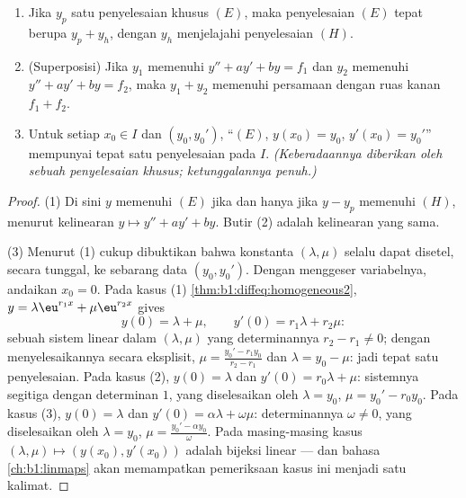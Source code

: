 \begin{theorem}\label{thm:b1:diffeq:structure2}
\begin{enumerate}
  \item Jika $y_p$ satu penyelesaian khusus $(E)$, maka penyelesaian
        $(E)$ tepat berupa $y_p + y_h$, dengan $y_h$ menjelajahi
        penyelesaian $(H)$.
  \item (Superposisi) Jika $y_1$ memenuhi $y'' + ay' + by = f_1$ dan
        $y_2$ memenuhi $y'' + ay' + by = f_2$, maka $y_1 + y_2$ memenuhi
        persamaan dengan ruas kanan $f_1 + f_2$.
  \item Untuk setiap $x_0 \in I$ dan $(y_0, y_0')$, 
        ``$(E)$, $y(x_0) = y_0$, $y'(x_0) = y_0'$'' mempunyai tepat satu
        penyelesaian pada $I$. \emph{(Keberadaannya diberikan oleh sebuah
        penyelesaian khusus; ketunggalannya penuh.)}
\end{enumerate}
\end{theorem}

\begin{proof}
(1) Di sini $y$ memenuhi $(E)$ jika dan hanya jika $y - y_p$ memenuhi $(H)$, menurut kelinearan $y
\mapsto y'' + ay' + by$. Butir (2) adalah kelinearan yang sama.

(3) Menurut (1) cukup dibuktikan bahwa konstanta $(\lambda,
\mu)$ selalu dapat disetel, secara tunggal, ke sebarang data $(y_0, y_0')$.
Dengan menggeser variabelnya, andaikan $x_0 = 0$. Pada kasus (1)
\cref{thm:b1:diffeq:homogeneous2}, $y = \lambda\eu^{r_1x} +
\mu\eu^{r_2x}$ gives
\[
y(0) = \lambda + \mu, \qquad y'(0) = r_1\lambda + r_2\mu :
\]
sebuah sistem linear dalam $(\lambda, \mu)$ yang determinannya $r_2 -
r_1 \neq 0$; dengan menyelesaikannya secara eksplisit, $\mu = \frac{y_0' -
r_1y_0}{r_2 - r_1}$ dan $\lambda = y_0 - \mu$: jadi tepat satu
penyelesaian. Pada kasus (2), $y(0) = \lambda$ dan $y'(0) = r_0\lambda +
\mu$: sistemnya segitiga dengan determinan $1$, yang diselesaikan oleh
$\lambda = y_0$, $\mu = y_0' - r_0y_0$. Pada kasus (3), $y(0) =
\lambda$ dan $y'(0) = \alpha\lambda + \omega\mu$: determinannya
$\omega \neq 0$, yang diselesaikan oleh $\lambda = y_0$, $\mu = \frac{y_0' -
\alpha y_0}\omega$. Pada masing-masing kasus  $(\lambda, \mu) \mapsto
(y(x_0), y'(x_0))$ adalah bijeksi linear --- dan bahasa
\cref{ch:b1:linmaps} akan memampatkan pemeriksaan kasus ini menjadi satu
kalimat.
\end{proof}

